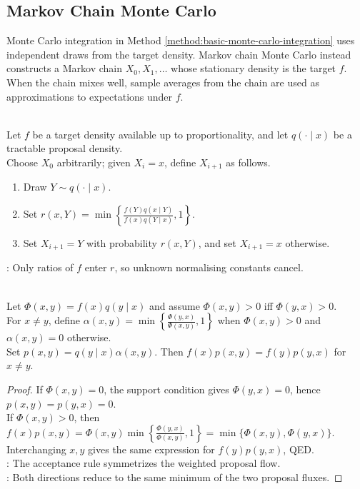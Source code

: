 \subsection{Markov Chain Monte Carlo}

Monte Carlo integration in Method \ref{method:basic-monte-carlo-integration} uses independent draws from the target density. Markov chain Monte Carlo instead constructs a Markov chain $X_0,X_1,\ldots$ whose stationary density is the target $f$. When the chain mixes well, sample averages from the chain are used as approximations to expectations under $f$.

\begin{method} \label{method:metropolis-hastings} \\
Let $f$ be a target density available up to proportionality, and let $q(\cdot\mid x)$ be a tractable proposal density.\\
Choose $X_0$ arbitrarily; given $X_i=x$, define $X_{i+1}$ as follows.
\begin{enumerate}[label=(\roman*)]
\setlength{\itemsep}{0pt}
\item Draw $Y\sim q(\cdot\mid x)$.
\item Set $r(x,Y)=\min\left\{\frac{f(Y)q(x\mid Y)}{f(x)q(Y\mid x)},1\right\}$.
\item Set $X_{i+1}=Y$ with probability $r(x,Y)$, and set $X_{i+1}=x$ otherwise.
\end{enumerate}
: Only ratios of $f$ enter $r$, so unknown normalising constants cancel.
\end{method}

\begin{proposition} \label{prop:mh-detailed-balance} \\
Let $\Phi(x,y)=f(x)q(y\mid x)$ and assume $\Phi(x,y)>0$ iff $\Phi(y,x)>0$.\\
For $x\neq y$, define $\alpha(x,y)=\min\left\{\frac{\Phi(y,x)}{\Phi(x,y)},1\right\}$ when $\Phi(x,y)>0$ and $\alpha(x,y)=0$ otherwise.\\
Set $p(x,y)=q(y\mid x)\alpha(x,y)$. Then $f(x)p(x,y)=f(y)p(y,x)$ for $x\neq y$.
\begin{proof}
If $\Phi(x,y)=0$, the support condition gives $\Phi(y,x)=0$, hence $p(x,y)=p(y,x)=0$.\\
If $\Phi(x,y)>0$, then $f(x)p(x,y)=\Phi(x,y)\min\left\{\frac{\Phi(y,x)}{\Phi(x,y)},1\right\}=\min\{\Phi(x,y),\Phi(y,x)\}$.\\
Interchanging $x,y$ gives the same expression for $f(y)p(y,x)$, QED.\\
: The acceptance rule symmetrizes the weighted proposal flow.\\
: Both directions reduce to the same minimum of the two proposal fluxes.
\end{proof}
\end{proposition}

